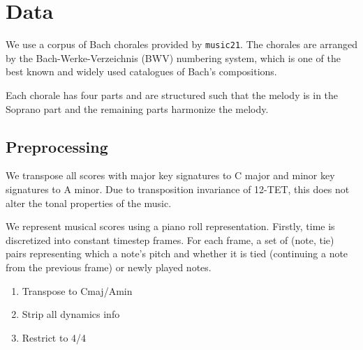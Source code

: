 \chapter{Data}

We use a corpus of Bach chorales provided by \texttt{music21}. The chorales are
arranged by the Bach-Werke-Verzeichnis (BWV) numbering system, which is one of
the best known and widely used catalogues of Bach's compositions.

Each chorale has four parts and are structured such that the melody is in
the Soprano part and the remaining parts harmonize the melody.

\section{Preprocessing}

We transpose all scores with major key signatures to C major and minor key
signatures to A minor. Due to transposition invariance of 12-TET, this does
not alter the tonal properties of the music.

We represent musical scores using a piano roll representation. Firstly, time is
discretized into constant timestep frames. For each frame, a set of (note, tie)
pairs representing which a note's pitch and whether it is tied
(continuing a note from the previous frame) or newly played notes.

\begin{enumerate}
    \item Transpose to Cmaj/Amin
    \item Strip all dynamics info
    \item Restrict to 4/4
\end{enumerate}

